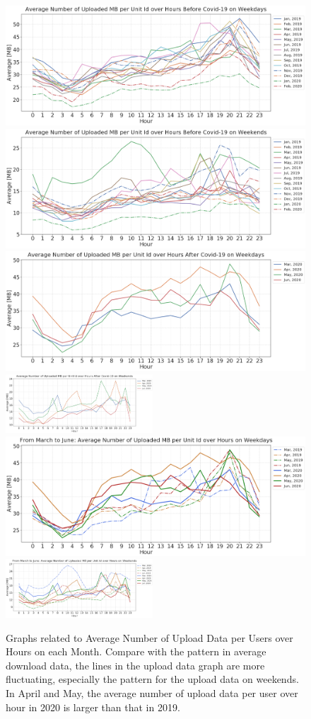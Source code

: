 \begin{figure}[t]
  \centering
  \includegraphics[width=.49\textwidth]{figs/wenjun/upload_wdays_before.png}
  \includegraphics[width=.49\textwidth]{figs/wenjun/upload_wends_before.png}
  \includegraphics[width=.49\textwidth]{figs/wenjun/upload_wdays_after.png}
  \includegraphics[width=0.49\textwidth]{figs/wenjun/upload_wends_after.png}
  \includegraphics[width=.49\textwidth]{figs/wenjun/upload_wdays_compare_36.png}
  \includegraphics[width=0.49\textwidth]{figs/wenjun/upload_wends_compare_36.png}

  \caption{Graphs related to Average Number of Upload Data per Users over Hours on each Month. Compare with the pattern in average download data, the lines in the upload data graph are more fluctuating, especially the pattern for the upload data on weekends. In April and May, the average number of upload data per user over hour in 2020 is larger than that in 2019.}
  
  \label{fig:upload_data_per_user_hours_fig}
\end{figure}

